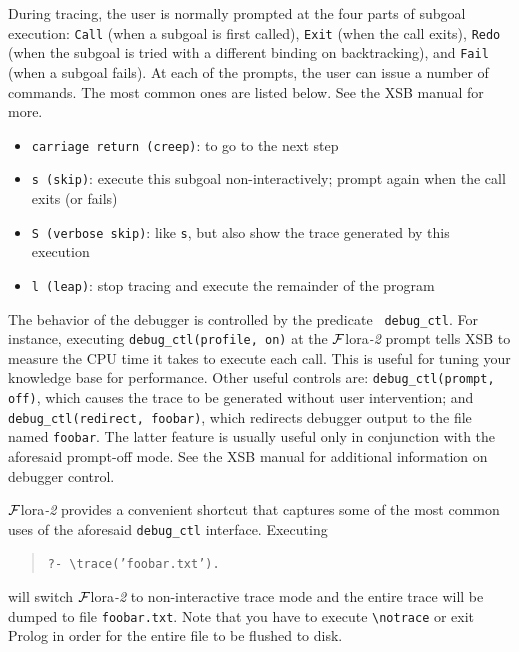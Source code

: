 \documentclass[11pt]{article}
\newcommand{\FLORA}{{\mbox{\sc ${\cal F}${lora}\rm\emph{-2}}}\xspace}
\newcommand{\FLSYSTEM}{\FLORA}
\newcommand{\bs}{\textbackslash}
\begin{document}
During tracing, the user is normally prompted at the four parts of subgoal
execution: {\tt Call} (when a subgoal is first called), {\tt Exit} (when
the call exits), {\tt Redo} (when the subgoal is tried with a different
binding on backtracking), and {\tt Fail} (when a subgoal fails).
At each of the prompts, the user can issue a number of commands. The most
common ones are listed below. See the XSB manual for more.
\begin{itemize}
  \item {\tt carriage return (creep)}:  to go to the next step  
  \item {\tt s (skip)}: execute this subgoal non-interactively; prompt
    again when the call exits (or fails)
  \item {\tt S (verbose skip)}: like {\tt s}, but also show the trace
    generated by this execution
  \item {\tt l (leap)}: stop tracing and execute the remainder of the
    program
\end{itemize}
The behavior of the debugger is controlled by the predicate {\tt
  debug\_ctl}. For instance, executing {\tt debug\_ctl(profile, on)} at the
\FLSYSTEM prompt tells XSB to measure the CPU time it takes to execute each
call. This is useful for tuning your knowledge base for performance. Other useful
controls are: {\tt debug\_ctl(prompt, off)}, which causes the trace to be
generated without user intervention; and {\tt debug\_ctl(redirect,
  foobar)}, which redirects debugger output to the file named {\tt foobar}.
The latter feature is usually useful only in conjunction with the aforesaid
prompt-off mode. See the XSB manual for additional information on debugger
control.

\index{\bs{}trace/1}
\FLSYSTEM provides a convenient shortcut that captures some of the most common
uses of the aforesaid {\tt debug\_ctl} interface. Executing
\begin{quote}
  {\tt     ?- \bs{}trace('foobar.txt').}
\end{quote}
will switch \FLSYSTEM to non-interactive trace mode
and the entire trace will be dumped to file {\tt foobar.txt}.
Note that you have to execute {\tt \bs{}notrace} or exit Prolog in order for the
entire file to be flushed to disk.
\end{document}

